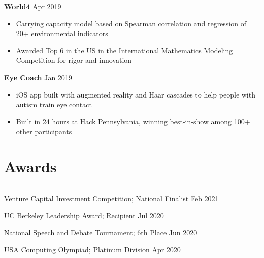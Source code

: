 \documentclass[11pt]{article}
\newcommand{\resumesection}[1]{\vspace{-0.6cm}\section*{\color{highlight}#1}\vspace{-0.3cm}\hrule\vspace{0.2cm}}
\begin{document}
\textbf{\href{https://github.com/gautomdas/IMMC-World4/blob/master/US-9365.pdf}{World4}} \hfill Apr 2019\par
\begin{itemize}
	\item Carrying capacity model based on Spearman correlation and regression of 20+ environmental indicators
	\item Awarded Top 6 in the US in the International Mathematics Modeling Competition for rigor and innovation
\end{itemize}\vspace{0.1cm} \par

\textbf{\href{https://github.com/gautomdas/eye-coach}{Eye Coach}} \hfill Jan 2019 \par
\begin{itemize}
	\item iOS app built with augmented reality and Haar cascades to help people with autism train eye contact
	\item Built in 24 hours at Hack Pennsylvania, winning best-in-show among 100+ other participants
\end{itemize}\vspace{0.1cm} \par

\resumesection{Awards}

Venture Capital Investment Competition; National Finalist \hfill Feb 2021\par
UC Berkeley Leadership Award; Recipient \hfill Jul 2020 \par
National Speech and Debate Tournament; 6th Place \hfill Jun 2020 \par
USA Computing Olympiad; Platinum Division \hfill Apr 2020 \par
\end{document}
